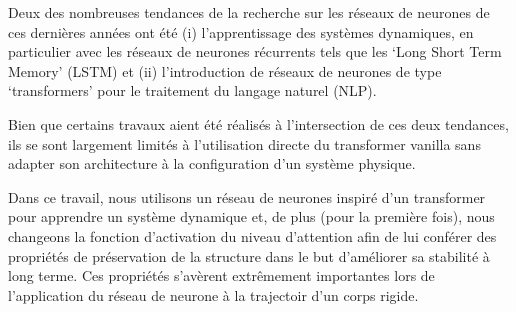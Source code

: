 Deux des nombreuses tendances de la recherche sur les réseaux de neurones de ces dernières années ont été (i) l'apprentissage des systèmes dynamiques, en particulier avec les réseaux de neurones récurrents tels que les `Long Short Term Memory' (LSTM) et (ii) l'introduction de réseaux de neurones de type `transformers' pour le traitement du langage naturel (NLP). %

Bien que certains travaux aient été réalisés à l'intersection de ces deux tendances, ils se sont largement limités à l'utilisation directe du transformer vanilla sans adapter son architecture à la configuration d'un système physique.

Dans ce travail, nous utilisons un réseau de neurones inspiré d'un transformer pour apprendre un système dynamique et, de plus (pour la première fois), nous changeons la fonction d'activation du niveau d'attention afin de lui conférer des propriétés de préservation de la structure dans le but d'améliorer sa stabilité à long terme. Ces propriétés s'avèrent extrêmement importantes lors de l'application du réseau de neurone à la trajectoir d'un corps rigide.
